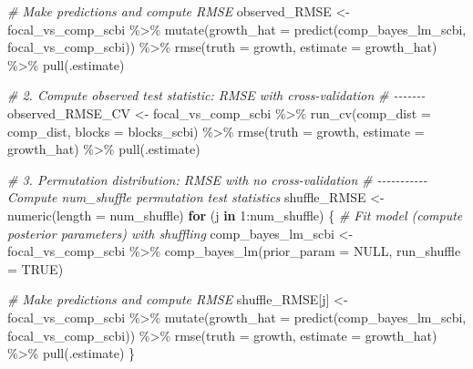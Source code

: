 \documentclass[12pt]{article}
\newenvironment{Shaded}{\begin{snugshade}}{\end{snugshade}}
\newcommand{\AttributeTok}[1]{\textcolor[rgb]{0.77,0.63,0.00}{#1}}
\newcommand{\CommentTok}[1]{\textcolor[rgb]{0.56,0.35,0.01}{\textit{#1}}}
\newcommand{\ConstantTok}[1]{\textcolor[rgb]{0.00,0.00,0.00}{#1}}
\newcommand{\ControlFlowTok}[1]{\textcolor[rgb]{0.13,0.29,0.53}{\textbf{#1}}}
\newcommand{\DecValTok}[1]{\textcolor[rgb]{0.00,0.00,0.81}{#1}}
\newcommand{\FunctionTok}[1]{\textcolor[rgb]{0.00,0.00,0.00}{#1}}
\newcommand{\NormalTok}[1]{#1}
\newcommand{\OtherTok}[1]{\textcolor[rgb]{0.56,0.35,0.01}{#1}}
\newcommand{\SpecialCharTok}[1]{\textcolor[rgb]{0.00,0.00,0.00}{#1}}
\begin{document}
\begin{Shaded}
\begin{Highlighting}[]
\CommentTok{\# Make predictions and compute RMSE}
\NormalTok{observed\_RMSE }\OtherTok{\textless{}{-}}\NormalTok{ focal\_vs\_comp\_scbi }\SpecialCharTok{\%\textgreater{}\%}
    \FunctionTok{mutate}\NormalTok{(}\AttributeTok{growth\_hat =} \FunctionTok{predict}\NormalTok{(comp\_bayes\_lm\_scbi, focal\_vs\_comp\_scbi)) }\SpecialCharTok{\%\textgreater{}\%}
    \FunctionTok{rmse}\NormalTok{(}\AttributeTok{truth =}\NormalTok{ growth, }\AttributeTok{estimate =}\NormalTok{ growth\_hat) }\SpecialCharTok{\%\textgreater{}\%}
    \FunctionTok{pull}\NormalTok{(.estimate)}

\CommentTok{\# 2. Compute observed test statistic: RMSE with cross{-}validation}
\CommentTok{\# {-}{-}{-}{-}{-}{-}{-}}
\NormalTok{observed\_RMSE\_CV }\OtherTok{\textless{}{-}}\NormalTok{ focal\_vs\_comp\_scbi }\SpecialCharTok{\%\textgreater{}\%}
    \FunctionTok{run\_cv}\NormalTok{(}\AttributeTok{comp\_dist =}\NormalTok{ comp\_dist, }\AttributeTok{blocks =}\NormalTok{ blocks\_scbi) }\SpecialCharTok{\%\textgreater{}\%}
    \FunctionTok{rmse}\NormalTok{(}\AttributeTok{truth =}\NormalTok{ growth, }\AttributeTok{estimate =}\NormalTok{ growth\_hat) }\SpecialCharTok{\%\textgreater{}\%}
    \FunctionTok{pull}\NormalTok{(.estimate)}

\CommentTok{\# 3. Permutation distribution: RMSE with no cross{-}validation}
\CommentTok{\# {-}{-}{-}{-}{-}{-}{-}{-}{-}{-}{-} Compute num\_shuffle permutation test statistics}
\NormalTok{shuffle\_RMSE }\OtherTok{\textless{}{-}} \FunctionTok{numeric}\NormalTok{(}\AttributeTok{length =}\NormalTok{ num\_shuffle)}
\ControlFlowTok{for}\NormalTok{ (j }\ControlFlowTok{in} \DecValTok{1}\SpecialCharTok{:}\NormalTok{num\_shuffle) \{}
    \CommentTok{\# Fit model (compute posterior parameters) with shuffling}
\NormalTok{    comp\_bayes\_lm\_scbi }\OtherTok{\textless{}{-}}\NormalTok{ focal\_vs\_comp\_scbi }\SpecialCharTok{\%\textgreater{}\%}
        \FunctionTok{comp\_bayes\_lm}\NormalTok{(}\AttributeTok{prior\_param =} \ConstantTok{NULL}\NormalTok{, }\AttributeTok{run\_shuffle =} \ConstantTok{TRUE}\NormalTok{)}

    \CommentTok{\# Make predictions and compute RMSE}
\NormalTok{    shuffle\_RMSE[j] }\OtherTok{\textless{}{-}}\NormalTok{ focal\_vs\_comp\_scbi }\SpecialCharTok{\%\textgreater{}\%}
        \FunctionTok{mutate}\NormalTok{(}\AttributeTok{growth\_hat =} \FunctionTok{predict}\NormalTok{(comp\_bayes\_lm\_scbi, focal\_vs\_comp\_scbi)) }\SpecialCharTok{\%\textgreater{}\%}
        \FunctionTok{rmse}\NormalTok{(}\AttributeTok{truth =}\NormalTok{ growth, }\AttributeTok{estimate =}\NormalTok{ growth\_hat) }\SpecialCharTok{\%\textgreater{}\%}
        \FunctionTok{pull}\NormalTok{(.estimate)}
\NormalTok{\}}


\end{Highlighting}
\end{Shaded}
\end{document}
